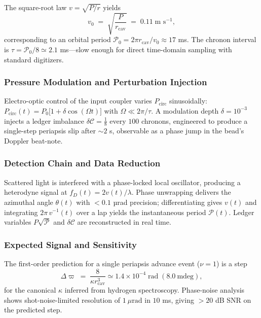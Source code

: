 \documentclass[11pt,oneside]{book}
\begin{document}
The square-root law $v=\sqrt{P/r}$ yields
\[
   v_{0}
   \;=\;
   \sqrt{\frac{P}{r_{\!\text{cav}}}}
   \;=\;
   0.11\;\text{m s}^{-1},
   \tag{2}
\]
corresponding to an orbital period $\mathscr P_{0}=2\pi r_{\!\text{cav}}/v_{0}
\approx17$ ms.  
The chronon interval is $\tau=\mathscr P_{0}/8\simeq2.1$ ms—slow
enough for direct time-domain sampling with standard digitizers.

\subsubsection{Pressure Modulation and Perturbation Injection}
\label{ss:submm-modulation}

Electro-optic control of the input coupler varies $P_{\text{circ}}$
sinusoidally:
$P_{\text{circ}}(t)=P_{0}\bigl[1+\delta\cos(\Omega t)\bigr]$
with $\Omega\ll2\pi/\tau$.  
A modulation depth $\delta=10^{-3}$ injects a ledger imbalance
$\delta\!\mathcal C = \tfrac{1}{8}$ every $100$ chronons,
engineered to produce a single-step periapsis slip after $\sim2$ s,
observable as a phase jump in the bead’s Doppler beat-note.

\subsubsection{Detection Chain and Data Reduction}
\label{ss:submm-detection}

Scattered light is interfered with a phase-locked local oscillator,
producing a heterodyne signal at $f_{D}(t)=2v(t)/\lambda$.
Phase unwrapping delivers the azimuthal angle $\theta(t)$ with
$<0.1$ µrad precision; differentiating gives $v(t)$ and integrating
$2\pi\,v^{-1}(t)$ over a lap yields the instantaneous period
$\mathscr P(t)$.  
Ledger variables $P\sqrt{\mathscr P}$ and
$\delta\!\mathcal C$ are reconstructed in real time.

\subsubsection{Expected Signal and Sensitivity}
\label{ss:submm-signal}

The first-order prediction for a single periapsis advance event
($\nu=1$) is a step
\[
   \Delta\varpi
   \;=\;
   \frac{8}{\kappa r_{\!\text{cav}}^{3}}
   \simeq
   1.4\times10^{-4}\;\text{rad}
   \;(8.0~\text{mdeg}),
   \tag{3}
\]
for the canonical $\kappa$ inferred from hydrogen spectroscopy.
Phase-noise analysis shows shot-noise-limited resolution of
$1~\mu\text{rad}$ in $10$ ms, giving $>20$ dB SNR on the predicted
step.
\end{document}
